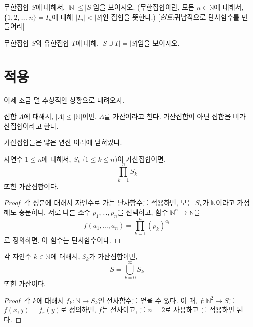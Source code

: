 \begin{exercise}
    무한집합 $S$에 대해서, $|\mathbb{N}| \leq |S|$임을 보이시오.
    (무한집합이란, 모든 $n \in \mathbb{N}$에 대해서, $\{1, 2, \dots, n\} = I_n$에 대해 $|I_n| < |S|$인 집합을 뜻한다.)
    [\textit{힌트}:귀납적으로 단사함수를 만들어라]
\end{exercise}
\begin{exercise}
    무한집합 $S$와 유한집합 $T$에 대해, $|S \cup T| = |S|$임을 보이시오.
\end{exercise}

\section{적용}
이제 조금 덜 추상적인 상황으로 내려오자.
\begin{definition}
    집합 $A$에 대해서, $|A| \leq |\mathbb{N}|$이면, $A$를 가산이라고 한다.
    가산집합이 아닌 집합을 비가산집합이라고 한다.
\end{definition}

가산집합들은 많은 연산 아래에 닫혀있다.
\begin{theorem}
\label{thm:cntprod}
    자연수 $1 \leq n$에 대해서, $S_k$ ($1 \leq k \leq n$)이 가산집합이면,
    \begin{equation*}
        \prod_{k = 1}^n S_k
    \end{equation*}
    또한 가산집합이다.
\end{theorem}
\begin{proof}
    각 성분에 대해서 자연수로 가는 단사함수를 적용하면, 모든 $S_k$가 $\mathbb{N}$이라고 가정해도 충분하다.
    서로 다른 소수 $p_1, \dots, p_n$을 선택하고, 함수 $\mathbb{N}^n \to \mathbb{N}$을 
    \begin{equation*}
        f(a_1, \dots, a_n) = \prod_{k = 1}^n (p_k)^{a_k}
    \end{equation*}
    로 정의하면, 이 함수는 단사함수이다.
\end{proof}
\begin{corollary}
    각 자연수 $k \in \mathbb{N}$에 대해서, $S_k$가 가산집합이면,
    \begin{equation*}
        S = \bigcup_{k = 0}^\infty S_k
    \end{equation*}
    또한 가산이다.
\end{corollary}
\begin{proof}
    각 $k$에 대해서 $f_k: \mathbb{N} \to S_k$인 전사함수를 얻을 수 있다.
    이 때, $f: \mathbb{N}^2 \to S$를 $f(x, y) = f_x(y)$로 정의하면, $f$는 전사이고, 를 $n = 2$로 사용하고 를 적용하면 된다.
\end{proof}


